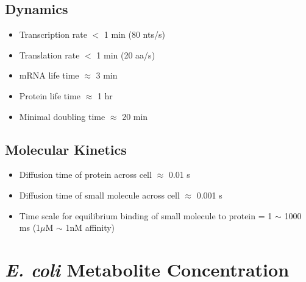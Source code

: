 \documentclass{article}
\begin{document}
        \subsection{Dynamics}
        \begin{itemize}
            \item Transcription rate $<$ 1 min (80 nts/s)
            \item Translation rate $<$ 1 min (20 aa/s)
            \item mRNA life time $\approx$ 3 min
            \item Protein life time $\approx$ 1 hr
            \item Minimal doubling time $\approx$ 20 min
        \end{itemize} 

        \subsection{Molecular Kinetics}
        \begin{itemize}
            \item Diffusion time of protein across cell $\approx$ 0.01 s
            \item Diffusion time of small molecule across cell $\approx$ 0.001 s
            \item Time scale for equilibrium binding of small molecule to protein = 1 $\sim$ 1000 ms (1$\mu$M $\sim$ 1nM affinity)
        \end{itemize} 

    \section{\textit{E. coli} Metabolite Concentration}

\end{document}
